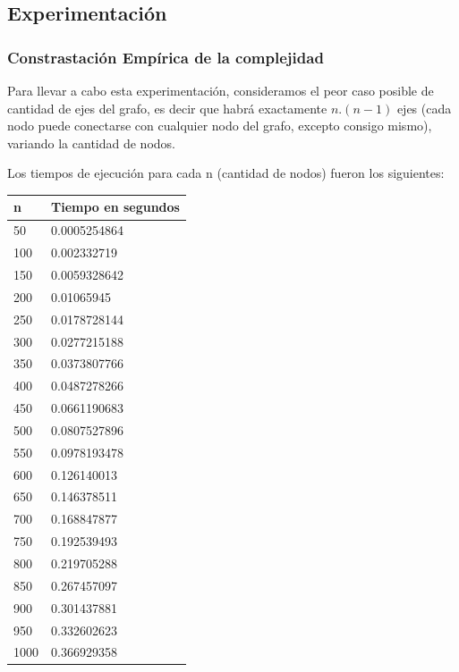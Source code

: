 \newpage
\subsection{Experimentaci\'on}
\subsubsection{Constrastaci\'on Emp\'irica de la complejidad}
	Para llevar a cabo esta experimentaci\'on, consideramos el peor caso posible de cantidad de ejes del grafo, es decir que habr\'a exactamente $n.(n-1)$ ejes (cada nodo puede conectarse con cualquier nodo del grafo, excepto consigo mismo), variando la cantidad de nodos.

	Los tiempos de ejecuci\'on para cada n (cantidad de nodos) fueron los siguientes:

	\begin{table}[htb]
	\centering
	\begin{tabular}[c]{|l|l|}

		\hline
n & Tiempo en segundos\\
		\hline
50	&	0.0005254864\\
		\hline
100	&	0.002332719\\
		\hline
150	&	0.0059328642\\
		\hline
200	&	0.01065945\\
		\hline
250	&	0.0178728144\\
		\hline
300	&	0.0277215188\\
		\hline
350	&	0.0373807766\\
		\hline
400	&	0.0487278266\\
		\hline
450	&	0.0661190683\\
		\hline
500	&	0.0807527896\\
		\hline
550	&	0.0978193478\\
		\hline
600	&	0.126140013\\
		\hline
650	&	0.146378511\\
		\hline
700	&	0.168847877\\
		\hline
750	&	0.192539493\\
		\hline
800	&	0.219705288\\
		\hline
850	&	0.267457097\\
		\hline
900	&	0.301437881\\
		\hline
950	&	0.332602623\\
		\hline
1000	&	0.366929358\\
		\hline

	\end{tabular}
	\end{table}

